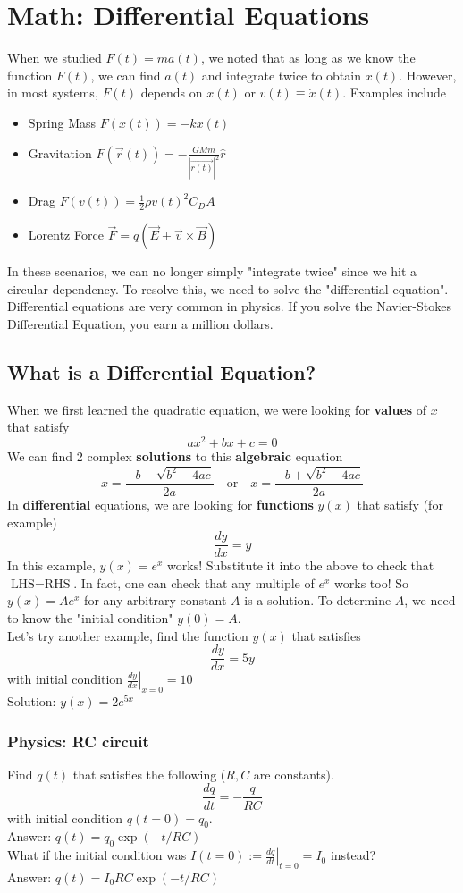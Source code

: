 \documentclass{article}
\begin{document}
\section{Math: Differential Equations}
When we studied $F(t)=ma(t)$, we noted that as long as we know the function $F(t)$, we can find $a(t)$ and integrate twice to obtain $x(t)$. However, in most systems, $F(t)$ depends on $x(t)$ or $v(t) \equiv \dot{x}(t)$. Examples include 
\begin{itemize}
    \item Spring Mass $F(x(t)) = -kx(t)$
    \item Gravitation $F(\vec{r}(t)) = -\frac{GMm}{|\vec{r(t)}|^2} \hat{r}$
    \item Drag $F(v(t)) = \frac{1}{2} \rho v(t)^2 C_D A$
    \item Lorentz Force $\vec{F} = q(\vec{E} + \vec{v} \times \vec{B})$
\end{itemize}
In these scenarios, we can no longer simply "integrate twice" since we hit a circular dependency. To resolve this, we need to solve the "differential equation". Differential equations are very common in physics. If you solve the Navier-Stokes Differential Equation, you earn a million dollars.

\subsection{What is a Differential Equation?}
When we first learned the quadratic equation, we were looking for \textbf{values} of $x$ that satisfy $$ax^2 + bx + c = 0$$  We can find 2 complex \textbf{solutions} to this \textbf{algebraic} equation
$$x = \frac{-b - \sqrt{b^2 - 4ac}}{2a} \quad \text{or}\quad x = \frac{-b + \sqrt{b^2 - 4ac}}{2a}$$
In \textbf{differential} equations, we are looking for \textbf{functions} $y(x)$ that satisfy (for example)
$$\frac{dy}{dx} = y$$
In this example, $y(x) = e^x$ works! Substitute it into the above to check that $\text{LHS} = \text{RHS}$. In fact, one can check that any multiple of $e^x$ works too! So $y(x) = A e^x$ for any arbitrary constant $A$ is a solution. To determine $A$, we need to know the "initial condition" $y(0) = A$.
\\[10pt]
Let's try another example, find the function $y(x)$ that satisfies 
$$\frac{dy}{dx} = 5y$$ with initial condition $\left. \frac{dy}{dx} \right|_{x=0} = 10$\\
Solution: $y(x) = 2e^{5x}$
\subsubsection{Physics: RC circuit} 
Find $q(t)$ that satisfies the following ($R,C$ are constants).
$$\frac{dq}{dt} = -\frac{q}{RC}$$ with initial condition $q(t=0) = q_0$. \\Answer: $q(t) = q_0 \exp (-t/RC)$ \\[10pt]
What if the initial condition was $I(t=0) := \left. \frac{dq}{dt} \right|_{t=0} = I_0$ instead? \\ Answer: $q(t) = {I_0 RC} \exp (-t/RC)$\\[10pt]
\end{document}
